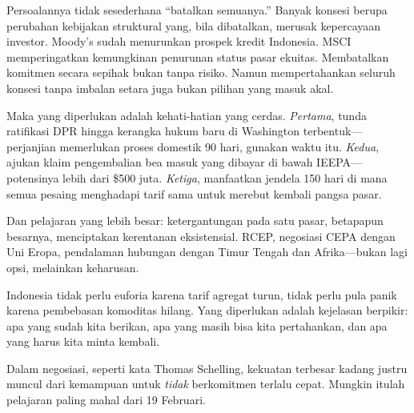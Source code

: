 \documentclass[12pt,a4paper]{article}
\begin{document}
Persoalannya tidak sesederhana ``batalkan semuanya.'' Banyak konsesi berupa perubahan kebijakan struktural yang, bila dibatalkan, merusak kepercayaan investor. Moody's sudah menurunkan prospek kredit Indonesia. MSCI memperingatkan kemungkinan penurunan status pasar ekuitas. Membatalkan komitmen secara sepihak bukan tanpa risiko. Namun mempertahankan seluruh konsesi tanpa imbalan setara juga bukan pilihan yang masuk akal.

Maka yang diperlukan adalah kehati-hatian yang cerdas. \textit{Pertama}, tunda ratifikasi DPR hingga kerangka hukum baru di Washington terbentuk---perjanjian memerlukan proses domestik 90 hari, gunakan waktu itu. \textit{Kedua}, ajukan klaim pengembalian bea masuk yang dibayar di bawah IEEPA---potensinya lebih dari \$500 juta. \textit{Ketiga}, manfaatkan jendela 150 hari di mana semua pesaing menghadapi tarif sama untuk merebut kembali pangsa pasar.

Dan pelajaran yang lebih besar: ketergantungan pada satu pasar, betapapun besarnya, menciptakan kerentanan eksistensial. RCEP, negosiasi CEPA dengan Uni Eropa, pendalaman hubungan dengan Timur Tengah dan Afrika---bukan lagi opsi, melainkan keharusan.

Indonesia tidak perlu euforia karena tarif agregat turun, tidak perlu pula panik karena pembebasan komoditas hilang. Yang diperlukan adalah kejelasan berpikir: apa yang sudah kita berikan, apa yang masih bisa kita pertahankan, dan apa yang harus kita minta kembali.

Dalam negosiasi, seperti kata Thomas Schelling, kekuatan terbesar kadang justru muncul dari kemampuan untuk \textit{tidak} berkomitmen terlalu cepat. Mungkin itulah pelajaran paling mahal dari 19 Februari.
\end{document}
